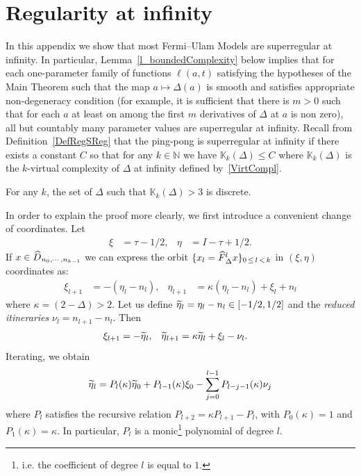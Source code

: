 \documentclass[AHL, Unicode, longabstracts,published]{cedram}
\newcommand{\bN}{\mathbb{N}}
\newcommand{\LC}{\mathbb{K}}
\newcommand{\hDom}{\hat D}
\newcommand{\nf}{\hat F}
\newcommand{\dn}{\nu}
\newcommand{\teta}{\tilde\eta}
\let\oldtilde\tilde
\renewcommand*{\tilde}[1]{\mathchoice{\widetilde{#1}}{\widetilde{#1}}{\oldtilde{#1}}{\oldtilde{#1}}}
\let\oldhat\hat
\renewcommand*{\hat}[1]{\mathchoice{\widehat{#1}}{\widehat{#1}}{\oldhat{#1}}{\oldhat{#1}}}
\begin{document}
\appendix
\section{Regularity at infinity}\label{AppRegInf}
In this appendix we show that most Fermi--Ulam Models are superregular at infinity. In particular, Lemma~\ref{l_boundedComplexity} below implies that for each one-parameter family of functions $\ell(a, t)$ satisfying the hypotheses of the Main Theorem such that the map $a\mapsto\Delta(a)$ is smooth and satisfies appropriate non-degeneracy condition (for example, it is sufficient that there is $m>0$ such that for each $a$ at least on among the first $m$ derivatives of $\Delta$ at $a$ is non zero), all but countably many parameter values are superregular at infinity. Recall from Definition~\ref{DefRegSReg} that the ping-pong is superregular at infinity if there exists a constant $C$ so that for any $k\in\bN$ we have $\LC_k(\Delta)\le C$ where $\LC_k(\Delta)$ is the $k$-virtual complexity of $\Delta$ at infinity defined by~\eqref{VirtCompl}.

\begin{lemm}\label{l_boundedComplexity}
For any $k$, the set of $\Delta$ such that $\LC_k(\Delta) > 3$ is discrete.
\end{lemm} 

In order to explain the proof more clearly, we first introduce a convenient change of coordinates. Let
\begin{align*}
\xi &= \tau-1/2,&
\eta& = I-\tau+1/2.
\end{align*}
If $x \in \hDom_{n_0,\cdots,n_{k-1}}$ we can express the orbit $\{x_l = \nf_\Delta^lx\}_{0\,\le\,l\,<\,k}$ in $(\xi,\eta)$ coordinates as:
\begin{align*}
\xi_{l+1} &= -(\eta_l-n_l),&
\eta_{l+1}&= \kappa(\eta_l-n_l) +\xi_l + n_l
\end{align*}
where $\kappa = (2-\Delta) > 2$. Let us define $\teta_l = \eta_l-n_l\in[-1/2,1/2]$ and the \emph{reduced itineraries} $\dn_l = n_{l+1}-n_l$. Then
\begin{align}\label{EtaXiForward}
\xi_{l+1} &= -\teta_l,&
\teta_{l+1}&= \kappa\teta_l +\xi_l - \dn_l.
\end{align}
Iterating, we obtain
\begin{align}\label{e_forwardPolynomial}
\teta_l = P_l(\kappa)\teta_0+P_{l-1}(\kappa)\xi_0-\sum_{j= 0}^{l-1}P_{l-j-1}(\kappa)\dn_j
\end{align}
where $P_l$ satisfies the recursive relation $P_{l+2} \!= \!\kappa P_{l+1}- P_l$, with $P_0(\kappa) \!=\! 1$ and $P_1(\kappa) = \kappa$. In particular, $P_l$ is a monic\footnote{ i.e. the coefficient of degree $l$ is equal to $1$.} polynomial of degree $l$.
\end{document}
